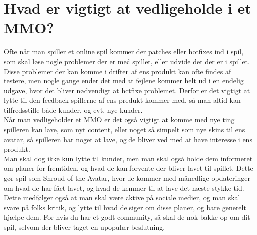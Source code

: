 \chapter{Hvad er vigtigt at vedligeholde i et MMO?}
Ofte når man spiller et online spil kommer der patches eller hotfixes ind i spil, som skal løse nogle problemer der er med spillet, eller udvide det der er i spillet. Disse problemer der kan komme i driften af ens produkt kan ofte findes af testere, men nogle gange ender det med at fejlene kommer helt ud i en endelig udgave, hvor det bliver nødvendigt at hotfixe problemet. Derfor er det vigtigt at lytte til den feedback spillerne af ens produkt kommer med, så man altid kan tilfredsstille både kunder, og evt. nye kunder.\\
Når man vedligeholder et MMO er det også vigtigt at komme med nye ting spilleren kan lave, som nyt content, eller noget så simpelt som nye skins til ens avatar, så spilleren har noget at lave, og de bliver ved med at have interesse i ens produkt.\cite{WoW}\\
Man skal dog ikke kun lytte til kunder, men man skal også holde dem informeret om planer for fremtiden, og hvad de kan forvente der bliver lavet til spillet. Dette gør spil som Shroud of the Avatar\cite{SOTA}, hvor de kommer med månedlige opdateringer om hvad de har fået lavet, og hvad de kommer til at lave det næste stykke tid\cite{SOTAForum}. Dette medfølger også at man skal være aktive på sociale medier, og man skal svare på folks kritik, og lytte til hvad de siger om disse planer, og bare generelt hjælpe dem\cite{GreatMMO}. For hvis du har et godt community, så skal de nok bakke op om dit spil, selvom der bliver taget en upopulær beslutning.\cite{MMOChampion}
